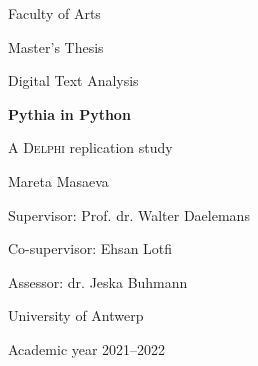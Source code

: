 \thispagestyle{plain}
    \begin{center}
    
        \vspace*{1cm}

        \large
        Faculty of Arts
        
        \vspace{0.5cm}
        Master’s Thesis 
        
        \vspace{0.5cm}
        Digital Text Analysis 
        
       \vspace{1.5cm}
            
        \Huge
        \textbf{Pythia in Python}
            
        \vspace{0.5cm}
        \LARGE
        A \textsc{Delphi} replication study
            
        \vspace{1.5cm}
        
        \Large    
        Mareta Masaeva
        
        \vspace{0.5cm}
        
        \large
        Supervisor: Prof. dr. Walter Daelemans
        
        \vspace{0.5cm}
        Co-supervisor: Ehsan Lotfi
        
        \vspace{0.5cm}
        Assessor: dr. Jeska Buhmann
        
        \vspace{1cm}
        University of Antwerp
        
        \vspace{1cm}   
        Academic year 2021–2022
            
    \end{center}
